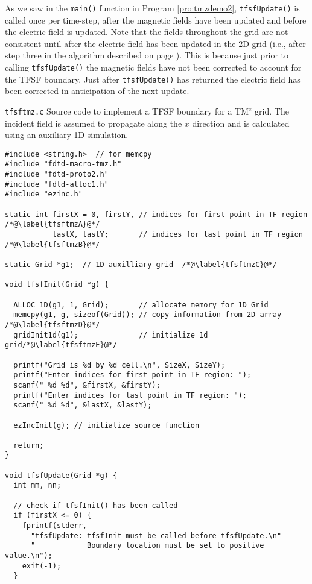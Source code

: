 As we saw in the {\tt main()} function in Program \ref{pro:tmzdemo2},
{\tt tfsfUpdate()} is called once per time-step, after the magnetic
fields have been updated and before the electric field is updated.
Note that the fields throughout the grid are not consistent until
after the electric field has been updated in the 2D grid (i.e., after
step three in the algorithm described on page
\pageref{page:tfsfUpdateAlgorithm}).  This is because just prior to
calling {\tt tfsfUpdate()} the magnetic fields have not been corrected
to account for the TFSF boundary.  Just after {\tt tfsfUpdate()} has
returned the electric field has been corrected in anticipation of the
next update.

\begin{program}
{\tt tfsftmz.c}
Source code to implement a TFSF boundary for a TM$^z$ grid.  The
incident field is assumed to propagate along the $x$ direction and is
calculated using an auxiliary 1D simulation.
\label{pro:tfsftmz}
\codemiddle
\begin{lstlisting}
#include <string.h>  // for memcpy
#include "fdtd-macro-tmz.h"
#include "fdtd-proto2.h"
#include "fdtd-alloc1.h"
#include "ezinc.h"

static int firstX = 0, firstY, // indices for first point in TF region /*@\label{tfsftmzA}@*/
           lastX, lastY;       // indices for last point in TF region  /*@\label{tfsftmzB}@*/

static Grid *g1;  // 1D auxilliary grid  /*@\label{tfsftmzC}@*/

void tfsfInit(Grid *g) {

  ALLOC_1D(g1, 1, Grid);       // allocate memory for 1D Grid
  memcpy(g1, g, sizeof(Grid)); // copy information from 2D array /*@\label{tfsftmzD}@*/
  gridInit1d(g1);              // initialize 1d grid/*@\label{tfsftmzE}@*/

  printf("Grid is %d by %d cell.\n", SizeX, SizeY);
  printf("Enter indices for first point in TF region: ");
  scanf(" %d %d", &firstX, &firstY);
  printf("Enter indices for last point in TF region: ");
  scanf(" %d %d", &lastX, &lastY);

  ezIncInit(g); // initialize source function

  return;
}

void tfsfUpdate(Grid *g) {
  int mm, nn;

  // check if tfsfInit() has been called
  if (firstX <= 0) {
    fprintf(stderr,
      "tfsfUpdate: tfsfInit must be called before tfsfUpdate.\n"
      "            Boundary location must be set to positive value.\n");
    exit(-1);
  }


\end{lstlisting}
\end{program}
